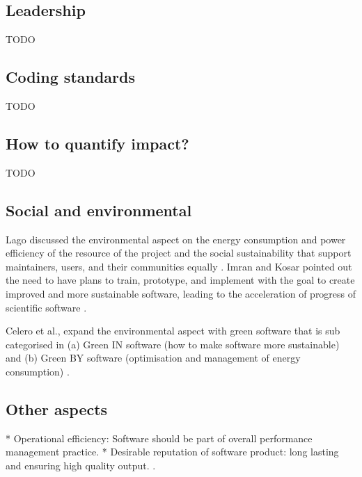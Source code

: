 \documentclass{article}
\begin{document}
\subsection{Leadership}
TODO

\subsection{Coding standards}
TODO


\subsection{How to quantify impact?}
TODO


\subsection{Social and environmental}
Lago discussed the environmental aspect on the energy consumption and power efficiency of the resource of the project and the social sustainability that support maintainers, users, and their communities equally
\cite{lago2019-Software-Sustainability}. 
Imran and Kosar pointed out the need to have plans to train, prototype, and implement with the goal to create improved and more sustainable software, leading to the acceleration of progress of scientific software \cite{imran2019software}.

Celero et al., expand the environmental aspect with green software that is sub categorised in (a) Green IN software (how to make software more sustainable) and (b) Green BY software (optimisation and management of energy consumption) \cite{calero2019-software-sustainability}.



\subsection{Other aspects}
* Operational efficiency: Software should be part of overall performance management practice. 
* Desirable reputation of software product: long lasting and ensuring high quality output.
\cite{imran2019software}.
\end{document}
